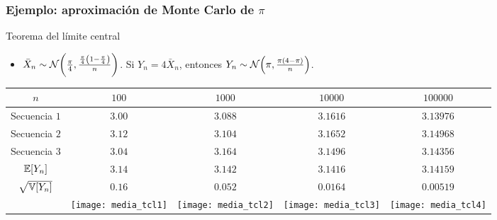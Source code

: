 \documentclass[table]{beamer}
\begin{document}
\begin{frame}
    \frametitle{Ejemplo: aproximación de Monte Carlo de $\pi$}
    \begin{block}{Teorema del límite central}
        \begin{itemize}
            \item $\bar{X}_{n} \sim \normal{\frac{\pi}{4}}{\frac{\frac{\pi}{4} \parens{1 - \frac{\pi}{4}}}{n}}$.
                Si $Y_{n} = 4 \bar{X}_{n}$, entonces $Y_{n} \sim \normal{\pi}{\frac{\pi \parens{4 - \pi}}{n}}$.
        \end{itemize}
    \end{block}
    \begin{center}
        \setlength{\tabcolsep}{0pt}
        \begin{tabular}{ccccc}
            $n$ & $100$ & $1000$ & $10000$ & $100000$ \\
            \hline
            Secuencia $1$ & $3.00$ & $3.088$ & $3.1616$ & $3.13976$ \\
            Secuencia $2$ & $3.12$ & $3.104$ & $3.1652$ & $3.14968$ \\
            Secuencia $3$ & $3.04$ & $3.164$ & $3.1496$ & $3.14356$ \\
            \hline
            $\expected{Y_{n}}$ & $3.14$ & $3.142$ & $3.1416$ & $3.14159$ \\
            $\sqrt{\variance{Y_{n}}}$ & $0.16$ & $0.052$ & $0.0164$ & $0.00519$ \\
            & \texttt{[image: media\_tcl1]} &
            \texttt{[image: media\_tcl2]} &
            \texttt{[image: media\_tcl3]} &
            \texttt{[image: media\_tcl4]}
        \end{tabular}
    \end{center}
\end{frame}
\end{document}

